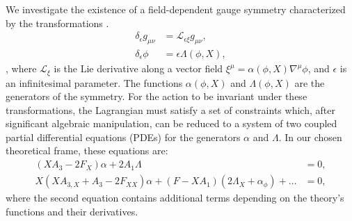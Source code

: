 \documentclass[twocolumn]{aastex631}
\begin{document}
We investigate the existence of a field-dependent gauge symmetry characterized by the transformations \citep{banerjee2000quantumgaugesymmetryfinite,upadhyay2012fielddependentnilpotentsymmetry,upadhyay2013finitefielddependentsymmetriesperturbative}.
\begin{align}\delta_\epsilon g_{\mu\nu} &= \mathcal{L}_{\epsilon \xi} g_{\mu\nu}, \\\delta_\epsilon \phi &= \epsilon \Lambda(\phi, X),\end{align}
\citep{popławski2024classicalphysicsspacetimefields,cranganore2025einsteinfieldsneuralperspective}, where $\mathcal{L}_{\xi}$ is the Lie derivative along a vector field $\xi^\mu = \alpha(\phi, X) \nabla^\mu \phi$, and $\epsilon$ is an infinitesimal parameter. The functions $\alpha(\phi, X)$ and $\Lambda(\phi, X)$ are the generators of the symmetry. For the action to be invariant under these transformations, the Lagrangian must satisfy a set of constraints which, after significant algebraic manipulation, can be reduced to a system of two coupled partial differential equations (PDEs) for the generators $\alpha$ and $\Lambda$. In our chosen theoretical frame, these equations are:
\begin{align}\left(X A_3 - 2 F_X\right) \alpha + 2 A_1 \Lambda &= 0, \label{eq:pde_one} \\X \left(X A_{3,X} + A_3 - 2 F_{XX}\right) \alpha + \left(F - X A_1 \right) \left(2 \Lambda_X + \alpha_\phi \right) + \dots &= 0, \label{eq:pde_two}\end{align}
where the second equation contains additional terms depending on the theory's functions and their derivatives.
\end{document}
